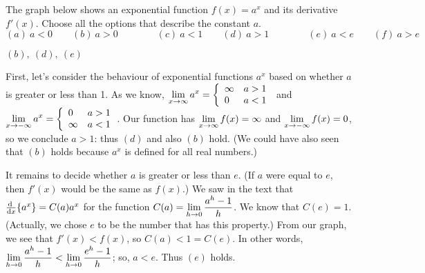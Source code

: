 \begin{Mquestion}
The graph below shows an exponential function $f(x)=a^x$  and its derivative $f'(x)$. Choose all the options that describe the  constant $a$.
\[(a)~a<0\qquad(b)~a>0\qquad\qquad(c)~a<1\qquad(d)~a>1\qquad\qquad(e)~a<e\qquad(f)~a>e\]

\begin{center}
\end{center}
\end{Mquestion}
\begin{hint}\end{hint}
\begin{answer} $(b),~(d),~(e)$
\end{answer}
\begin{solution}
First, let's consider the behaviour of exponential functions $a^x$ based on whether $a$ is greater or less than 1. As we know,
$\displaystyle\lim_{x\to\infty}a^x=\left\{\begin{array}{ll}
\infty & a>1\\0&a<1
\end{array}\right.$ and $\displaystyle\lim_{x\to-\infty}a^x=\left\{\begin{array}{ll}
0 & a>1\\\infty&a<1
\end{array}\right.$. Our function has $\displaystyle\lim_{x \to \infty} f(x)=\infty$ and
$\displaystyle\lim_{x \to -\infty} f(x)=0$, so we conclude $a>1$: thus $(d)$ and also $(b)$ hold. (We could have also seen that $(b)$ holds because $a^x$ is defined for all real numbers.)

It remains to decide whether $a$ is greater or less than $e$. (If $a$ were equal to $e$, then $f'(x)$ would be the same as $f(x)$.)  We saw in the text that $\diff{}{x}\{a^x\}=C(a)a^x$ for the function $C(a)=\displaystyle\lim_{h \to 0} \dfrac{a^h-1}{h}$. We know that $C(e)=1$. (Actually, we chose $e$ to be the number that has this property.) From our graph, we see that $f'(x)<f(x)$, so $C(a)<1=C(e)$. In other words, $\displaystyle\lim_{h \to 0} \dfrac{a^h-1}{h}<\displaystyle\lim_{h \to 0} \dfrac{e^h-1}{h}$; so, $a<e$. Thus $(e)$ holds.
\end{solution}


